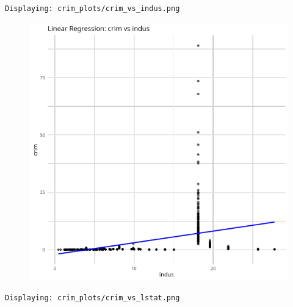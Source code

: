 \documentclass[
]{article}
\begin{document}
\begin{verbatim}
Displaying: crim_plots/crim_vs_indus.png 
\end{verbatim}

\begin{figure}[H]

{\centering \includegraphics{hw1_files/figure-pdf/unnamed-chunk-16-4.pdf}

}

\end{figure}

\begin{verbatim}
Displaying: crim_plots/crim_vs_lstat.png 
\end{verbatim}
\end{document}

